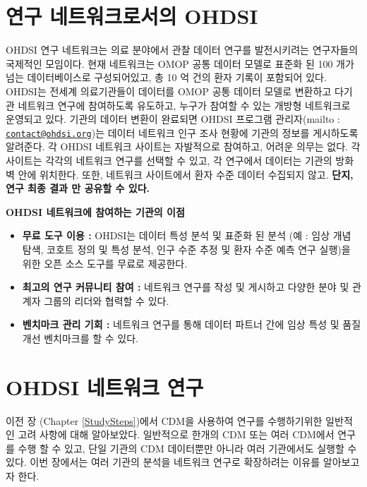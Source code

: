 \documentclass[11pt]{book}
\providecommand{\tightlist}{%
  \setlength{\itemsep}{0pt}\setlength{\parskip}{0pt}}
\theoremstyle{definition}
\theoremstyle{definition}
\theoremstyle{definition}
\theoremstyle{remark}
\let\BeginKnitrBlock\begin \let\EndKnitrBlock\end
\begin{document}
\section{연구 네트워크로서의 OHDSI}\label{--ohdsi}


OHDSI 연구 네트워크는 의료 분야에서 관찰 데이터 연구를 발전시키려는
연구자들의 국제적인 모임이다. 현재 네트워크는 OMOP 공통 데이터 모델로
표준화 된 100 개가 넘는 데이터베이스로 구성되어있고, 총 10 억 건의 환자
기록이 포함되어 있다. OHDSI는 전세계 의료기관들이 데이터를 OMOP 공통
데이터 모델로 변환하고 다기관 네트워크 연구에 참여하도록 유도하고,
누구가 참여할 수 있는 개방형 네트워크로 운영되고 있다. 기관의 데이터
변환이 완료되면 OHDSI 프로그램 관리자(mailto :
\href{mailto:contact@ohdsi.org}{\nolinkurl{contact@ohdsi.org}})는 데이터
네트워크 인구 조사 현황에 기관의 정보를 게시하도록 알려준다. 각 OHDSI
네트워크 사이트는 자발적으로 참여하고, 어려운 의무는 없다. 각 사이트는
각각의 네트워크 연구를 선택할 수 있고, 각 연구에서 데이터는 기관의
방화벽 안에 위치한다. 또한, 네트워크 사이트에서 환자 수준 데이터
수집되지 않고. \textbf{단지, 연구 최종 결과 만 공유할 수 있다.}

\BeginKnitrBlock{rmdimportant}
\textbf{OHDSI 네트워크에 참여하는 기관의 이점}

\begin{itemize}
\tightlist
\item
  \textbf{무료 도구 이용 :} OHDSI는 데이터 특성 분석 및 표준화 된 분석
  (예 : 임상 개념 탐색, 코호트 정의 및 특성 분석, 인구 수준 추정 및 환자
  수준 예측 연구 실행)을 위한 오픈 소스 도구를 무료로 제공한다.
\item
  \textbf{최고의 연구 커뮤니티 참여 :} 네트워크 연구를 작성 및 게시하고
  다양한 분야 및 관계자 그룹의 리더와 협력할 수 있다.
\item
  \textbf{벤치마크 관리 기회 :} 네트워크 연구를 통해 데이터 파트너 간에
  임상 특성 및 품질 개선 벤치마크를 할 수 있다.
\end{itemize}
\EndKnitrBlock{rmdimportant}

\section{OHDSI 네트워크 연구}\label{ohdsi--}


이전 장 (Chapter \ref{StudySteps})에서 CDM을 사용하여 연구를
수행하기위한 일반적인 고려 사항에 대해 알아보았다. 일반적으로 한개의 CDM
또는 여러 CDM에서 연구를 수행 할 수 있고, 단일 기관의 CDM 데이터뿐만
아니라 여러 기관에서도 실행할 수 있다. 이번 장에서는 여러 기관의 분석을
네트워크 연구로 확장하려는 이유를 알아보고자 한다.
\end{document}
